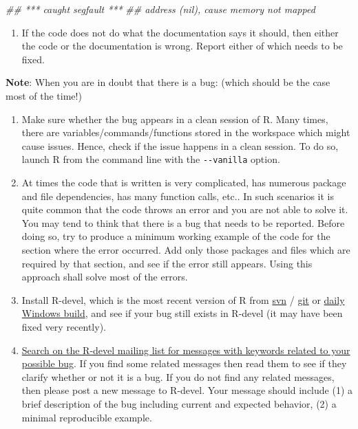 \documentclass[
  letterpaper,
  DIV=11,
  numbers=noendperiod]{scrreprt}
\newenvironment{Shaded}{\begin{snugshade}}{\end{snugshade}}
\newcommand{\DocumentationTok}[1]{\textcolor[rgb]{0.37,0.37,0.37}{\textit{#1}}}
\providecommand{\tightlist}{%
  \setlength{\itemsep}{0pt}\setlength{\parskip}{0pt}}\usepackage{longtable,booktabs,array}
\begin{document}
\begin{Shaded}
\begin{Highlighting}[]
\DocumentationTok{\#\#  *** caught segfault ***}
\DocumentationTok{\#\# address (nil), cause \textquotesingle{}memory not mapped\textquotesingle{}}
\end{Highlighting}
\end{Shaded}

\begin{enumerate}
\def\labelenumi{\arabic{enumi}.}
\setcounter{enumi}{1}
\tightlist
\item
  If the code does not do what the documentation says it should, then
  either the code or the documentation is wrong. Report either of which
  needs to be fixed.
\end{enumerate}

\textbf{Note}: When you are in doubt that there is a bug: (which should
be the case most of the time!)

\begin{enumerate}
\def\labelenumi{\arabic{enumi}.}
\item
  Make sure whether the bug appears in a clean session of R. Many times,
  there are variables/commands/functions stored in the workspace which
  might cause issues. Hence, check if the issue happens in a clean
  session. To do so, launch R from the command line with the
  \texttt{-\/-vanilla} option.
\item
  At times the code that is written is very complicated, has numerous
  package and file dependencies, has many function calls, etc.. In such
  scenarios it is quite common that the code throws an error and you are
  not able to solve it. You may tend to think that there is a bug that
  needs to be reported. Before doing so, try to produce a minimum
  working example of the code for the section where the error occurred.
  Add only those packages and files which are required by that section,
  and see if the error still appears. Using this approach shall solve
  most of the errors.
\item
  Install R-devel, which is the most recent version of R from
  \href{https://svn.r-project.org/R/trunk/}{svn} /
  \href{https://github.com/r-devel/r-svn}{git} or
  \href{https://cran.r-project.org/bin/windows/base/rdevel.html}{daily
  Windows build}, and see if your bug still exists in R-devel (it may
  have been fixed very recently).
\item
  \href{https://r.789695.n4.nabble.com/template/NamlServlet.jtp?macro=search_page&node=909078&query=isna&days=0}{Search
  on the R-devel mailing list for messages with keywords related to your
  possible bug}. If you find some related messages then read them to see
  if they clarify whether or not it is a bug. If you do not find any
  related messages, then please post a new message to R-devel. Your
  message should include (1) a brief description of the bug including
  current and expected behavior, (2) a minimal reproducible example.
\end{enumerate}
\end{document}
